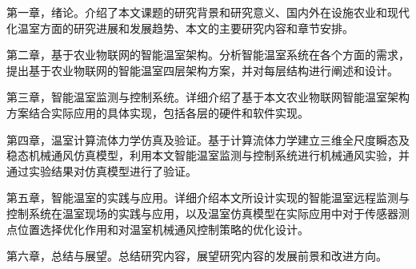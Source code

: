 第一章，绪论。介绍了本文课题的研究背景和研究意义、国内外在设施农业和现代化温室方面的研究进展和发展趋势、本文的主要研究内容和章节安排。

第二章，基于农业物联网的智能温室架构。分析智能温室系统在各个方面的需求，提出基于农业物联网的智能温室四层架构方案，并对每层结构进行阐述和设计。

第三章，智能温室监测与控制系统。详细介绍了基于本文农业物联网智能温室架构方案结合实际应用的具体实现，包括各层的硬件和软件实现。

第四章，温室计算流体力学仿真及验证。基于计算流体力学建立三维全尺度瞬态及稳态机械通风仿真模型，利用本文智能温室监测与控制系统进行机械通风实验，并通过实验结果对仿真模型进行了验证。

第五章，智能温室的实践与应用。详细介绍本文所设计实现的智能温室远程监测与控制系统在温室现场的实践与应用，以及温室仿真模型在实际应用中对于传感器测点位置选择优化作用和对温室机械通风控制策略的优化设计。

第六章，总结与展望。总结研究内容，展望研究内容的发展前景和改进方向。